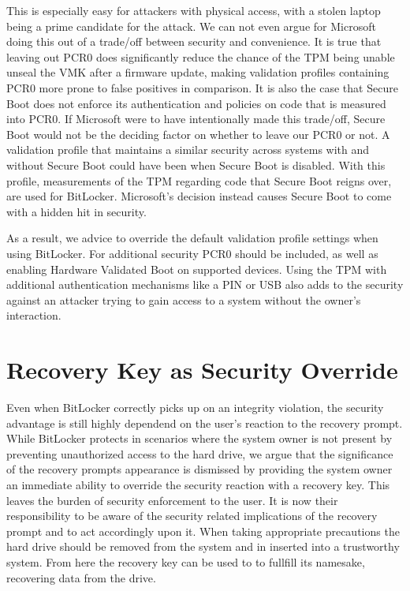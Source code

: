 This is especially easy for attackers with physical access, with a stolen laptop being a prime candidate for the attack.
We can not even argue for Microsoft doing this out of a trade\-/off between security and convenience.
It is true that leaving out \ac{PCR}0 does significantly reduce the chance of the \ac{TPM} being unable unseal the \ac{VMK} after a firmware update, making validation profiles containing \ac{PCR}0 more prone to false positives in comparison.
It is also the case that Secure Boot does not enforce its authentication and policies on code that is measured into \ac{PCR}0.
If Microsoft were to have intentionally made this trade\-/off, Secure Boot would not be the deciding factor on whether to leave our \ac{PCR}0 or not.
A validation profile that maintains a similar security across systems with and without Secure Boot could have been \hyperref[tab:pcr-usage]{} when Secure Boot is disabled.
With this profile, measurements of the \ac{TPM} regarding code that Secure Boot reigns over, are used for BitLocker.
Microsoft's decision instead causes Secure Boot to come with a hidden hit in security.

As a result, we advice to override the default validation profile settings when using BitLocker.
For additional security \ac{PCR}0 should be included, as well as enabling Hardware Validated Boot on supported devices.
Using the \ac{TPM} with additional authentication mechanisms like a \ac{PIN} or \ac{USB} also adds to the security against an attacker trying to gain access to a system without the owner's interaction.

\section{Recovery Key as Security Override}

Even when BitLocker correctly picks up on an integrity violation, the security advantage is still highly dependend on the user's reaction to the recovery prompt.
While BitLocker protects in scenarios where the system owner is not present by preventing unauthorized access to the hard drive, we argue that the significance of the recovery prompts appearance is dismissed by providing the system owner an immediate ability to override the security reaction with a recovery key.
This leaves the burden of security enforcement to the user.
It is now their responsibility to be aware of the security related implications of the recovery prompt and to act accordingly upon it.
When taking appropriate precautions the hard drive should be removed from the system and in inserted into a trustworthy system.
From here the recovery key can be used to to fullfill its namesake, recovering data from the drive.

